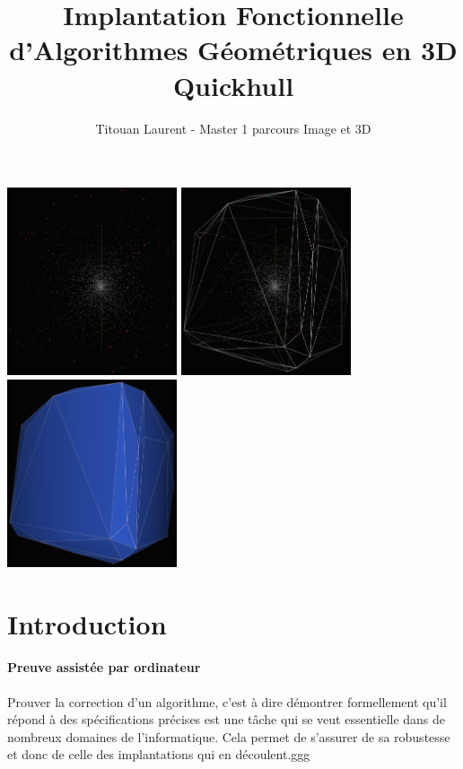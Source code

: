 \documentclass[]{article}
\title{Implantation Fonctionnelle \\ d'Algorithmes Géométriques en 3D \\
  \large Quickhull}
\author{Titouan Laurent - Master 1 parcours Image et 3D}
\date{}
\begin{document}
\maketitle

\includegraphics[width=5cm]{illus/illus0.png}
\includegraphics[width=5cm]{illus/illus1.png}
\includegraphics[width=5cm]{illus/illus2.png}

\tableofcontents

\section{Introduction}
\paragraph{Preuve assistée par ordinateur}
Prouver la correction d'un algorithme, c'est à dire démontrer formellement qu'il répond à des spécifications précises est une tâche qui se veut essentielle dans de nombreux domaines de l'informatique. Cela permet de s'assurer de sa robustesse et donc de celle des implantations qui en découlent.ggg
\end{document}
